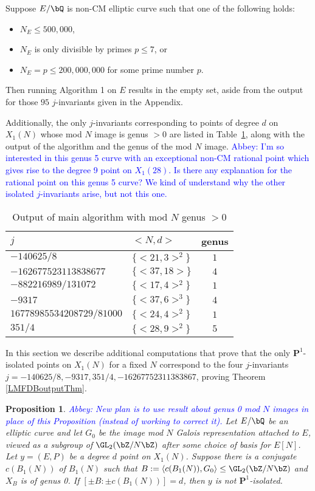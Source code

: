 \documentclass[11pt,reqno]{amsart}
\theoremstyle{plain}
\newtheorem{proposition}[theorem]{Proposition}
\theoremstyle{definition}
\newcommand{\Q}{\bQ}
\newcommand{\Z}{\bZ}
\newcommand{\PP}{\mathbf P}
\newcommand{\abbey}[1]{\textcolor{blue}{Abbey: #1}}
\newcommand{\abedit}[1]{{\color{blue} #1}}
\begin{document}
\abedit{Suppose $E/\Q$ is non-CM elliptic curve such that one of the following holds:
\begin{itemize}
    \item$N_E \leq 500{,}000$,
    \item $N_E$ is only divisible by primes $p \leq 7$, or
    \item $N_E=p \leq 200{,}000{,}000$ for some prime number $p$.
\end{itemize} Then running Algorithm 1 on $E$ results in the empty set, aside from the output for those $95$ $j$-invariants given in the Appendix.}
Additionally, the only $j$-invariants corresponding to points of degree $d$ on $X_1(N)$ whose mod $N$ image is genus $>0$ are listed in Table~\ref{table:imagegt0}, along with the output of the algorithm and the genus of the mod $N$ image. \abbey{I'm so interested in this genus 5 curve with an exceptional non-CM rational point which gives rise to the degree 9 point on $X_1(28)$. Is there any explanation for the rational point on this genus 5 curve? We kind of understand why the other isolated $j$-invariants arise, but not this one.}
	\begin{table}[h]
	\begin{center}
		\begin{tabularx}{242pt}{l l c} \toprule
		$j$ & $<N, d>$ & genus  \\\midrule
$-140625/8$ &  $\{ <21, 3>^2 \} $ & $1$\\
 $-162677523113838677$& $\{ <37, 18> \}$ & $4$\\
 $-882216989/131072$ & $\{ <17, 4>^2\}$ & $1$ \\
 $-9317$ & $\{ <37, 6>^3 \} $ & $4$\\
 $16778985534208729/81000$ & $\{ <24, 4>^2 \}$ & $1$\\
 $351/4$ & $\{ <28, 9>^2 \}$ & $5$\\ \bottomrule
		\end{tabularx}
		\caption{Output of main algorithm with mod $N$ genus $>0$}\label{table:imagegt0}
	\end{center}
\end{table}

In this section we describe additional computations that prove that the only $\PP^1$-isolated points on $X_1(N)$ for a fixed $N$ correspond to the four $j$-invariants $j=-140625/8,-9317,351/4, -16267752311383867$, proving Theorem \ref{LMFDBoutputThm}. 
\begin{proposition} \abbey{New plan is to use result about genus 0 mod $N$ images in place of this Proposition (instead of working to correct it).}
    Let $E/\Q$ be an elliptic curve and let $G_0$ be the image mod $N$ Galois representation attached to $E$, viewed as a subgroup of $\GL_2(\Z/N\Z)$ after some choice of basis for $E[N]$. Let $y=(E,P)$ be a degree $d$ point on $X_1(N)$. Suppose there is a conjugate $c(B_1(N))$ of $B_1(N)$ such that $B:=\langle c(B_1(N)), G_0 \rangle \leq \GL_2(\Z/N\Z)$ and $X_B$ is of genus 0. If $[\pm B: \pm c(B_1(N))]=d$, then $y$ is not $\PP^1$-isolated.
\end{proposition}
\end{document}
